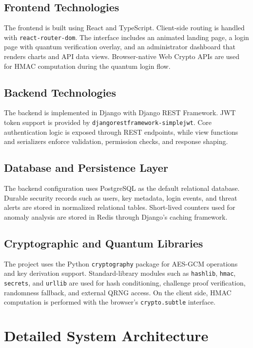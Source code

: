 \subsection{Frontend Technologies}
The frontend is built using React and TypeScript. Client-side routing is handled with \texttt{react-router-dom}. The interface includes an animated landing page, a login page with quantum verification overlay, and an administrator dashboard that renders charts and API data views. Browser-native Web Crypto APIs are used for HMAC computation during the quantum login flow.

\subsection{Backend Technologies}
The backend is implemented in Django with Django REST Framework. JWT token support is provided by \texttt{djangorestframework-simplejwt}. Core authentication logic is exposed through REST endpoints, while view functions and serializers enforce validation, permission checks, and response shaping.

\subsection{Database and Persistence Layer}
The backend configuration uses PostgreSQL as the default relational database. Durable security records such as users, key metadata, login events, and threat alerts are stored in normalized relational tables. Short-lived counters used for anomaly analysis are stored in Redis through Django's caching framework.

\subsection{Cryptographic and Quantum Libraries}
The project uses the Python \texttt{cryptography} package for AES-GCM operations and key derivation support. Standard-library modules such as \texttt{hashlib}, \texttt{hmac}, \texttt{secrets}, and \texttt{urllib} are used for hash conditioning, challenge proof verification, randomness fallback, and external QRNG access. On the client side, HMAC computation is performed with the browser's \texttt{crypto.subtle} interface.

\section{Detailed System Architecture}

